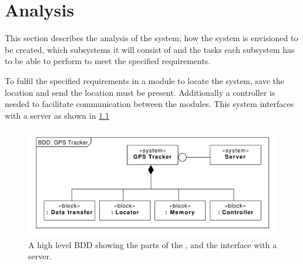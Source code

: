 
\chapter{Analysis}
This section describes the analysis of the system; how the system is envisioned to be created, which subsystems it will consist of and the tasks each subsystem has to be able to perform to meet the specified requirements.

To fulfil the specified requirements in  a module to locate the system, save the location and send the location must be present. Additionally a controller is needed to facilitate communication between the modules. This system interfaces with a server as shown in \cref{fig:BDD:unspecified}

\begin{figure}[H]
	\centering
	\includegraphics[width=0.7\linewidth]{gfx/Design/BDD_Unspecified.pdf}
	\caption{A high level BDD showing the parts of the \systemName, and the interface with a server.}
	\label{fig:BDD:unspecified}
\end{figure}

\FloatBarrier
